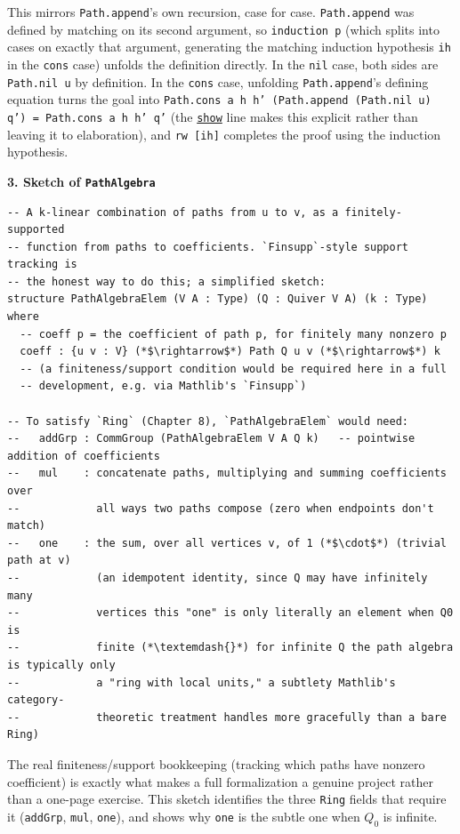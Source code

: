 This mirrors \texttt{Path.append}'s own recursion, case for case. \texttt{Path.append} was defined by matching on its second argument, so \texttt{induction p} (which splits into cases on exactly that argument, generating the matching induction hypothesis \texttt{ih} in the \texttt{cons} case) unfolds the definition directly. In the \texttt{nil} case, both sides are \texttt{Path.nil u} by definition. In the \texttt{cons} case, unfolding \texttt{Path.append}'s defining equation turns the goal into \texttt{Path.cons a h h' (Path.append (Path.nil u) q') = Path.cons a h h' q'} (the \href{https://lean-lang.org/doc/reference/latest/Tactic-Proofs/Tactic-Reference/}{\texttt{show}} line makes this explicit rather than leaving it to elaboration), and \texttt{rw [ih]} completes the proof using the induction hypothesis.

\textbf{3. Sketch of \texttt{PathAlgebra}}

\begin{lstlisting}
-- A k-linear combination of paths from u to v, as a finitely-supported
-- function from paths to coefficients. `Finsupp`-style support tracking is
-- the honest way to do this; a simplified sketch:
structure PathAlgebraElem (V A : Type) (Q : Quiver V A) (k : Type) where
  -- coeff p = the coefficient of path p, for finitely many nonzero p
  coeff : {u v : V} (*$\rightarrow$*) Path Q u v (*$\rightarrow$*) k
  -- (a finiteness/support condition would be required here in a full
  -- development, e.g. via Mathlib's `Finsupp`)

-- To satisfy `Ring` (Chapter 8), `PathAlgebraElem` would need:
--   addGrp : CommGroup (PathAlgebraElem V A Q k)   -- pointwise addition of coefficients
--   mul    : concatenate paths, multiplying and summing coefficients over
--            all ways two paths compose (zero when endpoints don't match)
--   one    : the sum, over all vertices v, of 1 (*$\cdot$*) (trivial path at v)
--            (an idempotent identity, since Q may have infinitely many
--            vertices this "one" is only literally an element when Q0 is
--            finite (*\textemdash{}*) for infinite Q the path algebra is typically only
--            a "ring with local units," a subtlety Mathlib's category-
--            theoretic treatment handles more gracefully than a bare Ring)
\end{lstlisting}

The real finiteness/support bookkeeping (tracking which paths have nonzero coefficient) is exactly what makes a full formalization a genuine project rather than a one-page exercise. This sketch identifies the three \texttt{Ring} fields that require it (\texttt{addGrp}, \texttt{mul}, \texttt{one}), and shows why \texttt{one} is the subtle one when \(Q_0\) is infinite.

